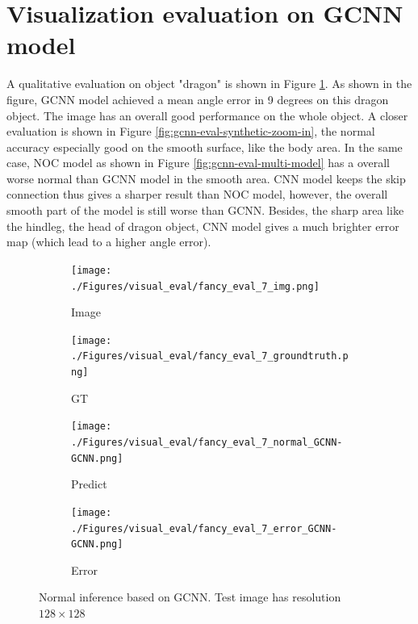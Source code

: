 \documentclass[border=15pt, multi, tikz]{article}
\begin{document}
\section{Visualization evaluation on GCNN model}
A qualitative evaluation on object "dragon" is shown in Figure \ref{fig:gcnn-eval}. As shown in the figure, GCNN model achieved a mean angle error in 9 degrees on this dragon object. The image has an overall good performance on the whole object. A closer evaluation is shown in Figure \ref{fig:gcnn-eval-synthetic-zoom-in}, the normal accuracy especially good on the smooth surface, like the body area. In the same case, NOC model as shown in Figure  \ref{fig:gcnn-eval-multi-model} has a overall worse normal than GCNN model in the smooth area. CNN model keeps the skip connection thus gives a sharper result than NOC model, however, the overall smooth part of the model is still worse than GCNN. Besides, the sharp area like the hindleg, the head of dragon object, CNN model gives a much brighter error map (which lead to a higher angle error).


\begin{figure}[H]
	\centering
	\begin{subfigure}[b]{0.24\linewidth}
		\texttt{[image: ./Figures/visual\_eval/fancy\_eval\_7\_img.png]}
		\caption{Image}
	\end{subfigure}
	\begin{subfigure}[b]{0.24\linewidth}
		\texttt{[image: ./Figures/visual\_eval/fancy\_eval\_7\_groundtruth.png]}
		\caption{GT}
	\end{subfigure}
	\begin{subfigure}[b]{0.24\linewidth}
		\texttt{[image: ./Figures/visual\_eval/fancy\_eval\_7\_normal\_GCNN-GCNN.png]}
		\caption{Predict}
	\end{subfigure}
	\begin{subfigure}[b]{0.24\linewidth}
		\texttt{[image: ./Figures/visual\_eval/fancy\_eval\_7\_error\_GCNN-GCNN.png]}
		\caption{Error}
	\end{subfigure}
	
	
	\caption{Normal inference based on GCNN. Test image has resolution $ 128\times128 $}
	\label{fig:gcnn-eval}
\end{figure}
\end{document}
